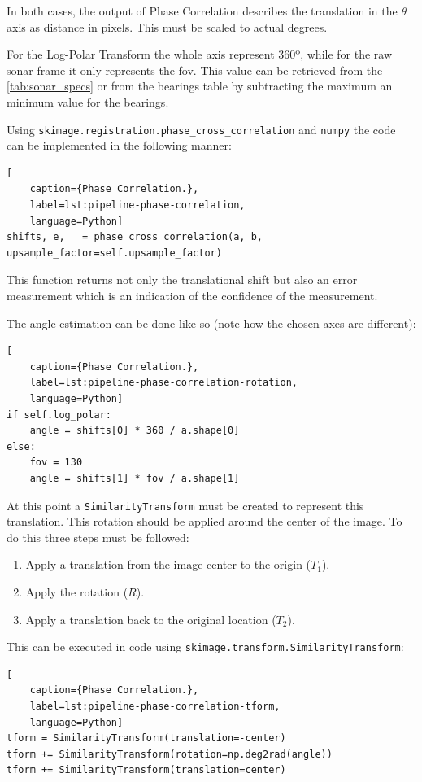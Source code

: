 In both cases, the output of Phase Correlation describes the translation in the \(\theta\) axis as distance in pixels. This must be scaled to actual degrees.

For the Log-Polar Transform the whole axis represent 360º, while for the raw sonar frame it only represents the \acrfull{fov}. This value can be retrieved from the \autoref{tab:sonar_specs} or from the bearings table by subtracting the maximum an minimum value for the bearings. 

Using \texttt{skimage.registration.phase\_cross\_correlation} and \texttt{numpy} the code can be implemented in the following manner:

\begin{lstlisting}[
    caption={Phase Correlation.},
    label=lst:pipeline-phase-correlation,
    language=Python]
shifts, e, _ = phase_cross_correlation(a, b, upsample_factor=self.upsample_factor)
\end{lstlisting}

This function returns not only the translational shift but also an error measurement which is an indication of the confidence of the measurement.

The angle estimation can be done like so (note how the chosen axes are different): 
\begin{lstlisting}[
    caption={Phase Correlation.},
    label=lst:pipeline-phase-correlation-rotation,
    language=Python]
if self.log_polar:
    angle = shifts[0] * 360 / a.shape[0]
else:
    fov = 130
    angle = shifts[1] * fov / a.shape[1]
\end{lstlisting}

At this point a \texttt{SimilarityTransform} must be created to represent this translation. This rotation should be applied around the center of the image. To do this three steps must be followed:
\begin{enumerate}
    \item Apply a translation from the image center to the origin (\(T_1\)).
    \item Apply the rotation (\(R\)).
    \item Apply a translation back to the original location (\(T_2\)).
\end{enumerate}

This can be executed in code using \texttt{skimage.transform.SimilarityTransform}:
\begin{lstlisting}[
    caption={Phase Correlation.},
    label=lst:pipeline-phase-correlation-tform,
    language=Python]
tform = SimilarityTransform(translation=-center)
tform += SimilarityTransform(rotation=np.deg2rad(angle))
tform += SimilarityTransform(translation=center)
\end{lstlisting}

